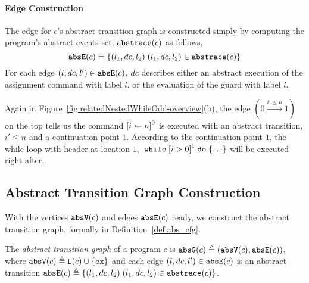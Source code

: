 \paragraph{Edge Construction}
The edge for $c$'s abstract transition graph is constructed simply by computing the program's abstract events set, $\mathtt{abs}{\mathtt{trace}}(c)$ as follows,
 \[
 \mathtt{abs}{\mathtt{E}}(c) = \{(l_1, dc, l_2) | (l_1, dc, l_2) \in \mathtt{abs}{\mathtt{trace}}(c)\}
 \]
For each edge $(l, dc, l') \in \mathtt{abs}{\mathtt{E}}(c)$, $dc$ describes either an abstract execution of the assignment command with label $l$,
or the evaluation of the guard with label $l$.
%

Again in Figure~\ref{fig:relatedNestedWhileOdd-overview}(b),
the edge $(0 \xrightarrow{i' \leq n} 1)$ on the top tells us the command 
$\clabel{\assign{i}{n}}^0$ is executed with an abstract transition, $i' \leq n$ and a continuation point $1$. 
According to the continuation point $1$, the while loop with header at location $1$, $\ewhile \clabel{i > 0}^1 \edo \{\ldots\}$ will be executed right after.

\subsection{Abstract Transition Graph Construction} 
With the vertices $\mathtt{abs}{\mathtt{V}}(c)$ and edges $\mathtt{abs}{\mathtt{E}}(c)$ ready, we construct the abstract transition graph, formally in
Definition~\ref{def:abs_cfg}.
%
\begin{defn}
 \label{def:psRB-abs_cfg}
 The \emph{abstract transition graph} of a program $c$ is $\mathtt{abs}{\mathtt{G}}(c) \triangleq (\mathtt{abs}{\mathtt{V}}(c), \mathtt{abs}{\mathtt{E}}(c))$, where
 $\mathtt{abs}{\mathtt{V}}(c) \triangleq \mathtt{L}(c)\cup\{\mathtt{ex}\}$
 and each edge $(l, dc, l') \in \mathtt{abs}{\mathtt{E}}(c)$ is an abstract transition
 $\mathtt{abs}{\mathtt{E}}(c) \triangleq \{(l_1, dc, l_2) | (l_1, dc, l_2) \in \mathtt{abs}{\mathtt{trace}}(c)\}$.
\end{defn}

